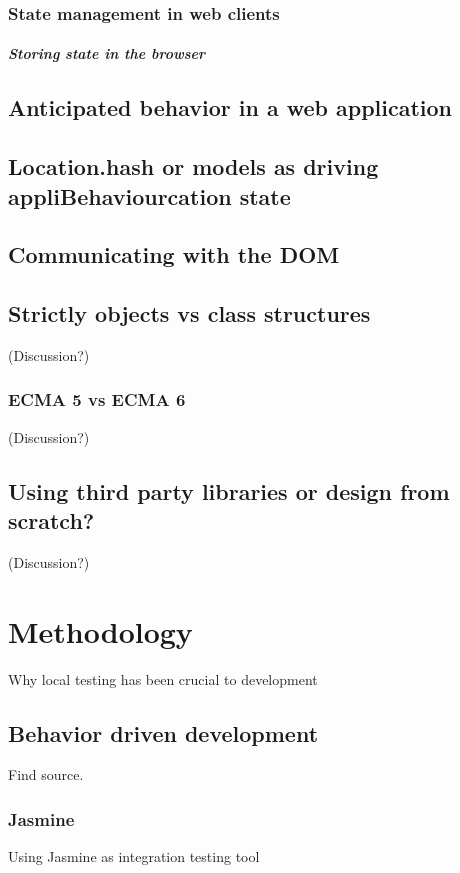 \documentclass[english]{ifimaster}
\begin{document}
\subsection{State management in web clients}
\paragraph{Storing state in the browser}

\section{Anticipated behavior in a web application}


\section{Location.hash or models as driving appliBehaviourcation state}

\section{Communicating with the DOM}

\section{Strictly objects vs class structures} (Discussion?)
\subsection{ECMA 5 vs ECMA 6} (Discussion?)

\section{Using third party libraries or design from scratch?} (Discussion?)

\chapter{Methodology}
Why local testing has been crucial to development 

\section{Behavior driven development}
Find source.

\subsection{Jasmine}
Using Jasmine as integration testing tool
\end{document}

